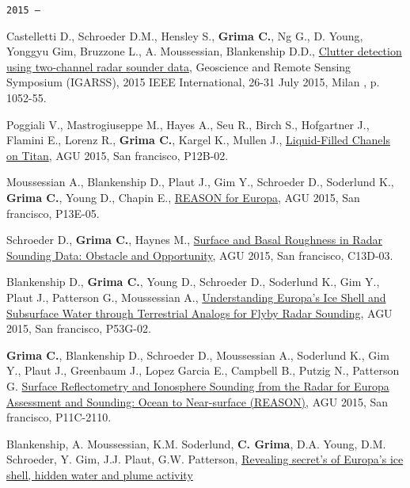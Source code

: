 \begin{etaremune}
\hspace{-2em}\texttt{2015 ---}

\item
  Castelletti D., Schroeder D.M., Hensley S., \textbf{Grima C.}, Ng G.,
  D. Young, Yonggyu Gim, Bruzzone L., A. Moussessian, Blankenship D.D.,
  \href{http://ieeexplore.ieee.org/xpl/articleDetails.jsp?reload=true\&arnumber=7325950}{Clutter
  detection using two-channel radar sounder data}, Geoscience and Remote
  Sensing Symposium (IGARSS), 2015 IEEE International, 26-31 July 2015,
  Milan , p. 1052-55.
\item
  Poggiali V., Mastrogiuseppe M., Hayes A., Seu R., Birch S., Hofgartner
  J., Flamini E., Lorenz R., \textbf{Grima C.}, Kargel K., Mullen J.,
  \href{https://agu.confex.com/agu/fm15/meetingapp.cgi/Paper/83937}{Liquid-Filled
  Chanels on Titan}, AGU 2015, San francisco, P12B-02.
\item
  Moussessian A., Blankenship D., Plaut J., Gim Y., Schroeder D.,
  Soderlund K., \textbf{Grima C.}, Young D., Chapin E.,
  \href{https://agu.confex.com/agu/fm15/meetingapp.cgi/Paper/84483}{REASON
  for Europa}, AGU 2015, San francisco, P13E-05.
\item
  Schroeder D., \textbf{Grima C.}, Haynes M.,
  \href{https://agu.confex.com/agu/fm15/meetingapp.cgi/Paper/61923}{Surface
  and Basal Roughness in Radar Sounding Data: Obstacle and Opportunity},
  AGU 2015, San francisco, C13D-03.
\item
  Blankenship D., \textbf{Grima C.}, Young D., Schroeder D., Soderlund
  K., Gim Y., Plaut J., Patterson G., Moussessian A.,
  \href{https://agu.confex.com/agu/fm15/meetingapp.cgi/Paper/85704}{Understanding
  Europa's Ice Shell and Subsurface Water through Terrestrial Analogs
  for Flyby Radar Sounding}, AGU 2015, San francisco, P53G-02.
\item
  \textbf{Grima C.}, Blankenship D., Schroeder D., Moussessian A.,
  Soderlund K., Gim Y., Plaut J., Greenbaum J., Lopez Garcia E.,
  Campbell B., Putzig N., Patterson G.
  \href{https://agu.confex.com/agu/fm15/meetingapp.cgi/Paper/83156}{Surface
  Reflectometry and Ionosphere Sounding from the Radar for Europa
  Assessment and Sounding: Ocean to Near-surface (REASON)}, AGU 2015,
  San francisco, P11C-2110.
\item
  Blankenship, A. Moussessian, K.M. Soderlund, \textbf{C. Grima}, D.A.
  Young, D.M. Schroeder, Y. Gim, J.J. Plaut, G.W. Patterson,
  \href{http://www.hou.usra.edu/meetings/abscicon2015/pdf/7627.pdf}{Revealing
  secret's of Europa's ice shell, hidden water and plume activity
}
\end{etaremune}
